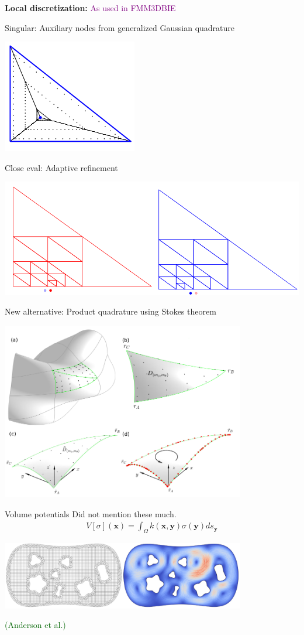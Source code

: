 \documentclass[t]{beamer}
\newcommand{\mbf}[1]{{\bm #1}}           %
\newcommand{\who}[1]{{\scriptsize \textcolor{darkgreen}{(#1)}}}  %
\newcommand{\com}[1]{{\scriptsize \textcolor{purple}{#1}}}      %
\newcommand{\xx}{\mbf{x}}
\newcommand{\yy}{\mbf{y}}
\begin{document}
\begin{frame}
  \textbf{Local discretization:} \com{As used in FMM3DBIE}

  Singular: Auxiliary nodes from generalized Gaussian quadrature
  \begin{center}
    \includegraphics[height=0.2\textwidth]{fig/bremer_triangle}
  \end{center}
  \pause
  Close eval: Adaptive refinement
  \begin{center}
    \includegraphics[height=0.2\textwidth]{fig/panel_adap_ref}
  \end{center}  
\end{frame}

\begin{frame}
  New alternative: Product quadrature using Stokes theorem
  \begin{center}
    \includegraphics[width=0.8\textwidth]{fig/hai_product_quad}
  \end{center}
\end{frame}

\begin{frame}{Volume potentials}
  Did not mention these much.
  \begin{align}
    V[\sigma](\xx) = \int_\Omega k(\xx, \yy) \sigma(\yy) ds_\yy
  \end{align}
  \begin{center}
    \includegraphics[width=0.8\textwidth]{fig/anderson_volpot}
  \end{center}
  \hfill\who{Anderson et al.}
\end{frame}
\end{document}
